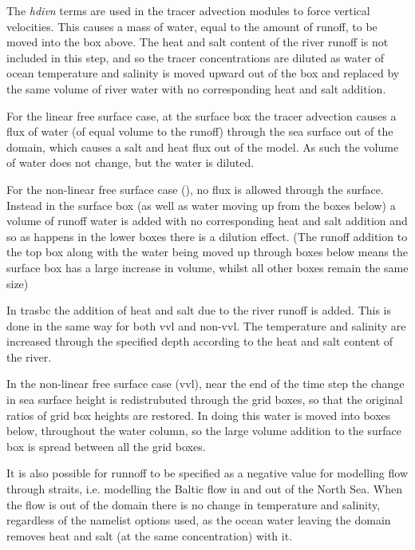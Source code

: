 The \textit{hdivn} terms are used in the tracer advection modules to force vertical velocities.
This causes a mass of water, equal to the amount of runoff, to be moved into the box above. 
The heat and salt content of the river runoff is not included in this step, and so the tracer 
concentrations are diluted as water of ocean temperature and salinity is moved upward out of the box 
and replaced by the same volume of river water with no corresponding heat and salt addition.

For the linear free surface case, at the surface box the tracer advection causes a flux of water 
(of equal volume to the runoff) through the sea surface out of the domain, which causes a salt and heat flux out of the model.
As such the volume of water does not change, but the water is diluted.

For the non-linear free surface case (), no flux is allowed through the surface.
Instead in the surface box (as well as water moving up from the boxes below) a volume of runoff water 
is added with no corresponding heat and salt addition and so as happens in the lower boxes there is a dilution effect.
(The runoff addition to the top box along with the water being moved up through boxes below means the surface box has a large 
increase in volume, whilst all other boxes remain the same size)

In trasbc the addition of heat and salt due to the river runoff is added.
This is done in the same way for both vvl and non-vvl.
The temperature and salinity are increased through the specified depth according to the heat and salt content of the river. 

In the non-linear free surface case (vvl), near the end of the time step the change in sea surface height is redistrubuted 
through the grid boxes, so that the original ratios of grid box heights are restored.
In doing this water is moved into boxes below, throughout the water column, so the large volume addition to the surface box is spread between all the grid boxes.

It is also possible for runnoff to be specified as a negative value for modelling flow through straits, i.e. modelling the Baltic flow in and out of the North Sea.
When the flow is out of the domain there is no change in temperature and salinity, regardless of the namelist options used, as the ocean water leaving the domain removes heat and salt (at the same concentration) with it. 



